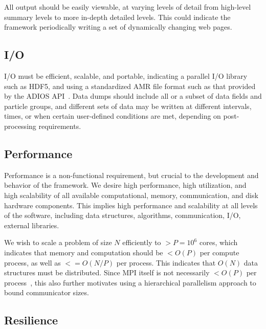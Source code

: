 \documentclass{article}
\begin{document}
All output should be easily viewable, at varying levels of detail from
high-level summary levels to more in-depth detailed levels.  This
could indicate the framework periodically writing a set of dynamically
changing web pages.


\subsection{I/O }

I/O must be efficient, scalable, and portable, indicating a parallel
I/O library such as HDF5, and using a standardized AMR file format
such as that provided by the ADIOS API~\cite{LoKl08}.  Data dumps
should include all or a subset of data fields and particle groups, and
different sets of data may be written at different intervals, times,
or when certain user-defined conditions are met, depending on
post-processing requirements.

\subsection{Performance}

Performance is a non-functional requirement, but crucial to the
development and behavior of the framework.  We desire high
performance, high utilization, and high scalability of all available
computational, memory, communication, and disk hardware components.
This implies high performance and scalability at all levels of the
software, including data structures, algorithms, communication, I/O,
external libraries.

We wish to scale a problem of size $N$ efficiently to $> P = 10^6$
cores, which indicates that memory and computation should be $< O(P)$
per compute process, as well as $<= O(N/P)$ per process.  This
indicates that $O(N)$ data structures must be distributed.  Since MPI
itself is not necessarily $< O(P)$ per process~\cite{BaBu09}, this also
further motivates using a hierarchical parallelism approach to bound
communicator sizes.

\subsection{Resilience} \label{ss:require-resilience}
\end{document}

